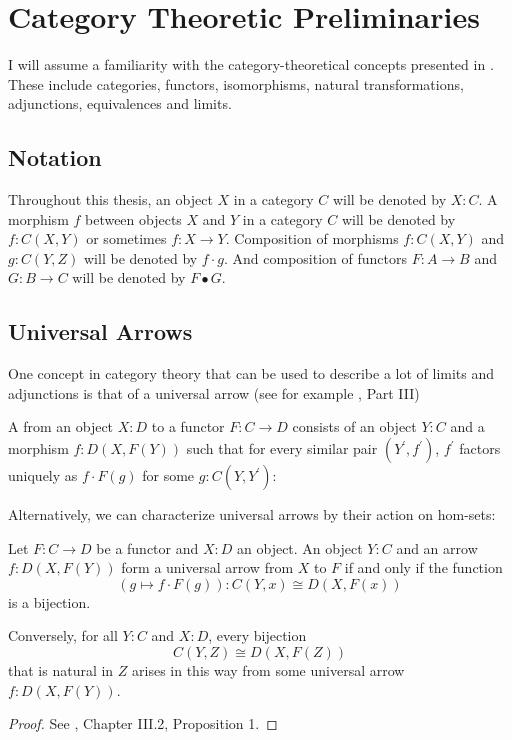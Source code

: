 \chapter{Category Theoretic Preliminaries}\label{ch:category-theory}

I will assume a familiarity with the category-theoretical concepts presented in \autocite{CT4P}. These include categories, functors, isomorphisms, natural transformations, adjunctions, equivalences and limits.

\section{Notation}
Throughout this thesis, an object $ X $ in a category $ C $ will be denoted by $ X : C $. A morphism $ f $ between objects $ X $ and $ Y $ in a category $ C $ will be denoted by $ f: C(X, Y) $ or sometimes $ f: X \to Y $. Composition of morphisms $ f: C(X, Y) $ and $ g: C(Y, Z) $ will be denoted by $ f \cdot g $. And composition of functors $ F: A \to B $ and $ G: B \to C $ will be denoted by $ F \bullet G $.

\section{Universal Arrows}

One concept in category theory that can be used to describe a lot of limits and adjunctions is that of a universal arrow (see for example \autocite{MacLane}, Part III)
\begin{definition}
  A  from an object $ X: D $ to a functor $ F: C \to D $ consists of an object $ Y: C $ and a morphism $ f: D(X, F(Y)) $ such that for every similar pair $ (Y^\prime, f^\prime) $, $ f^\prime $ factors uniquely as $ f \cdot F(g) $ for some $ g: C(Y, Y^\prime) $:
  \begin{center}
  \end{center}
\end{definition}

Alternatively, we can characterize universal arrows by their action on hom-sets:
\begin{lemma}
  Let $ F: C \to D $ be a functor and $ X: D $ an object. An object $ Y: C $ and an arrow $ f: D(X, F(Y)) $ form a universal arrow from $ X $ to $ F $ if and only if the function
  \[ (g \mapsto f \cdot F(g)) : C(Y, x) \cong D(X, F(x)) \]
  is a bijection.

  Conversely, for all $ Y: C $ and $ X: D $, every bijection
  \[ C(Y, Z) \cong D(X, F(Z)) \]
  that is natural in $ Z $ arises in this way from some universal arrow $ f: D(X, F(Y)) $.
\end{lemma}
\begin{proof}
  See \autocite{MacLane}, Chapter III.2, Proposition 1.
\end{proof}

